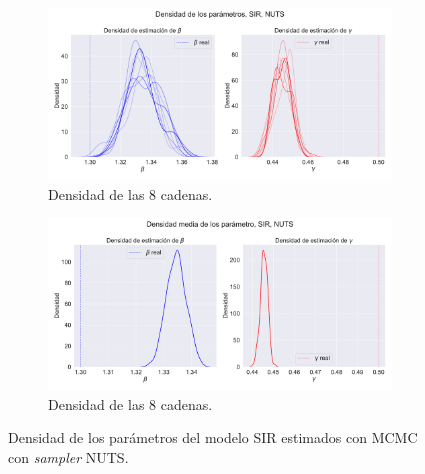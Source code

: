 \begin{figure}[h]
    \centering
    \begin{subfigure}[b]{\linewidth}
        \centering
        \includegraphics[width=0.55\linewidth]{img/content/chapter4/NUTS_sir_params_density.pdf}
        \caption{Densidad de las 8 cadenas.}
    \end{subfigure}
     \begin{subfigure}[b]{\linewidth}
        \centering
        \includegraphics[width=0.55\linewidth]{img/content/chapter4/NUTS_sir_params_density_mean.pdf}
        \caption{Densidad de las 8 cadenas.}
    \end{subfigure}
    \caption{Densidad de los parámetros del modelo SIR estimados con MCMC con \textit{sampler} NUTS.}
\end{figure}

